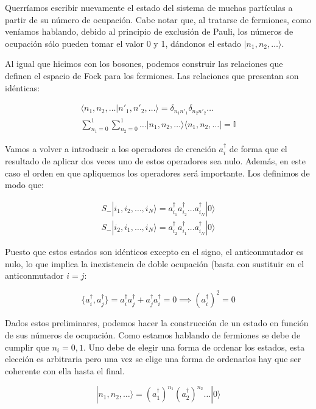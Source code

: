 \documentclass{article} %
\begin{document}
Querríamos escribir nuevamente el estado del sistema de muchas partículas a partir de su número de ocupación. Cabe notar que, al tratarse de fermiones, como veníamos hablando, debido al principio de exclusión de Pauli, los números de ocupación sólo pueden tomar el valor 0 y 1, dándonos el estado $|n_1, n_2, \ldots\rangle$.

Al igual que hicimos con los bosones, podemos construir las relaciones que definen el espacio de Fock para los fermiones. Las relaciones que presentan son idénticas:

\begin{align}
\langle n_1, n_2, \ldots | n'_1, n'_2, \ldots\rangle = \delta_{n_1n'_1} \delta_{n_2n'_2} \ldots \\
\sum_{n_1=0}^1 \sum_{n_2=0}^1 \ldots |n_1, n_2, \ldots\rangle\langle n_1, n_2, \ldots | = \mathbb{I}
\end{align}

Vamos a volver a introducir a los operadores de creación $a^{\dagger}_i$ de forma que el resultado de aplicar dos veces uno de estos operadores sea nulo. Además, en este caso el orden en que apliquemos los operadores será importante. Los definimos de modo que:

$$
\begin{array}{c}
S_- |i_1, i_2, \ldots, i_N \rangle = a_{i_1}^{\dagger} a_{i_2}^{\dagger} \ldots a_{i_N}^{\dagger} |0\rangle \\
S_- |i_2, i_1, \ldots, i_N \rangle = a_{i_2}^{\dagger} a_{i_1}^{\dagger} \ldots a_{i_N}^{\dagger} |0\rangle 
\end{array}
$$

Puesto que estos estados son idénticos excepto en el signo, el anticonmutador es nulo, lo que implica la inexistencia de doble ocupación (basta con sustituir en el anticonmutador $i = j$:

$$
\{a_i^{\dagger}, a_j^{\dagger}\} = a_i^{\dagger}  a_j^{\dagger} + a_j^{\dagger} a_i^{\dagger} = 0 \implies \left( a_i^{\dagger} \right)^2 = 0
$$

Dados estos preliminares, podemos hacer la construcción de un estado en función de sus números de ocupación. Como estamos hablando de fermiones se debe de cumplir que $n_i = 0, 1$. Uno debe de elegir una forma de ordenar los estados, esta elección es arbitraria pero una vez se elige una forma de ordenarlos hay que ser coherente con ella hasta el final.

\begin{equation}
|n_1, n_2, \ldots\rangle = \left( a_1^{\dagger} \right)^{n_1} \left( a_2^{\dagger} \right)^{n_2} \ldots |0\rangle
\end{equation}
\end{document}
